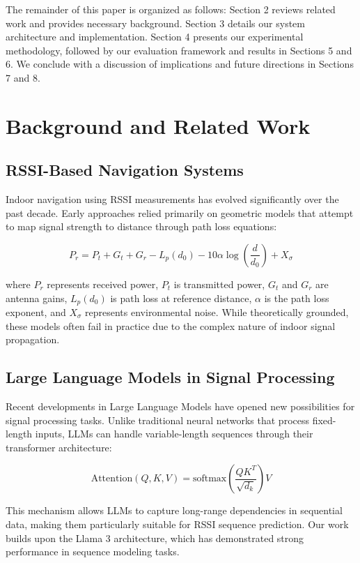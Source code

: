 \documentclass[12pt]{article}
\begin{document}
The remainder of this paper is organized as follows: Section 2 reviews related work and provides necessary background. Section 3 details our system architecture and implementation. Section 4 presents our experimental methodology, followed by our evaluation framework and results in Sections 5 and 6. We conclude with a discussion of implications and future directions in Sections 7 and 8.

\section{Background and Related Work}

\subsection{RSSI-Based Navigation Systems}

Indoor navigation using RSSI measurements has evolved significantly over the past decade. Early approaches relied primarily on geometric models that attempt to map signal strength to distance through path loss equations:

\[
P_r = P_t + G_t + G_r - L_p(d_0) - 10\alpha\log\left(\frac{d}{d_0}\right) + X_\sigma
\]

where $P_r$ represents received power, $P_t$ is transmitted power, $G_t$ and $G_r$ are antenna gains, $L_p(d_0)$ is path loss at reference distance, $\alpha$ is the path loss exponent, and $X_\sigma$ represents environmental noise. While theoretically grounded, these models often fail in practice due to the complex nature of indoor signal propagation.

\subsection{Large Language Models in Signal Processing}

Recent developments in Large Language Models have opened new possibilities for signal processing tasks. Unlike traditional neural networks that process fixed-length inputs, LLMs can handle variable-length sequences through their transformer architecture:

\[
\text{Attention}(Q, K, V) = \text{softmax}\left(\frac{QK^T}{\sqrt{d_k}}\right)V
\]

This mechanism allows LLMs to capture long-range dependencies in sequential data, making them particularly suitable for RSSI sequence prediction. Our work builds upon the Llama 3 architecture, which has demonstrated strong performance in sequence modeling tasks.
\end{document}
